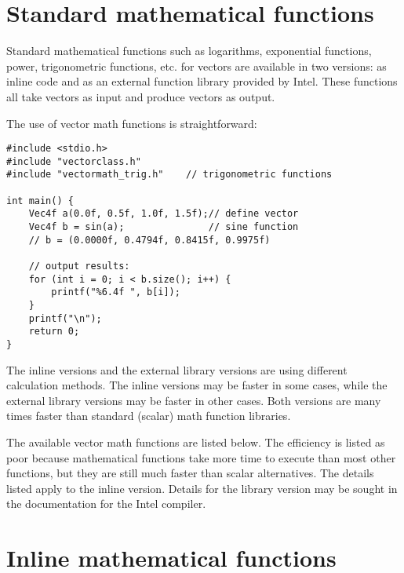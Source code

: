 \documentclass[vcl_manual.tex]{subfiles}
\begin{document}
\section{Standard mathematical functions}\label{FPMathematicalFunctions}

Standard mathematical functions such as logarithms, exponential functions, power, trigonometric functions, etc. for vectors are available in two versions: as inline code and as an external function library provided by Intel. These functions all take vectors as input and produce vectors as output.


The use of vector math functions is straightforward:
\begin{example}
\label{exampleSinFunction}
\end{example} %
\begin{lstlisting}[frame=single]
#include <stdio.h>
#include "vectorclass.h"
#include "vectormath_trig.h"    // trigonometric functions

int main() {
    Vec4f a(0.0f, 0.5f, 1.0f, 1.5f);// define vector
    Vec4f b = sin(a);               // sine function
    // b = (0.0000f, 0.4794f, 0.8415f, 0.9975f)

    // output results:
    for (int i = 0; i < b.size(); i++) {
        printf("%6.4f ", b[i]);
    }
    printf("\n");
    return 0;
}

\end{lstlisting}

The inline versions and the external library versions are using different calculation methods. The inline versions may be faster in some cases, while the external library versions may be faster in other cases. Both versions are many times faster than standard (scalar) math function libraries. 

The available vector math functions are listed below. The efficiency is listed as poor because mathematical functions take more time to execute than most other functions, but they are still much faster than scalar alternatives. The details listed apply to the inline version. Details for the library version may be sought in the documentation for the Intel compiler.


\section{Inline mathematical functions}\label{InlineMathematicalFunctions}
\end{document}
